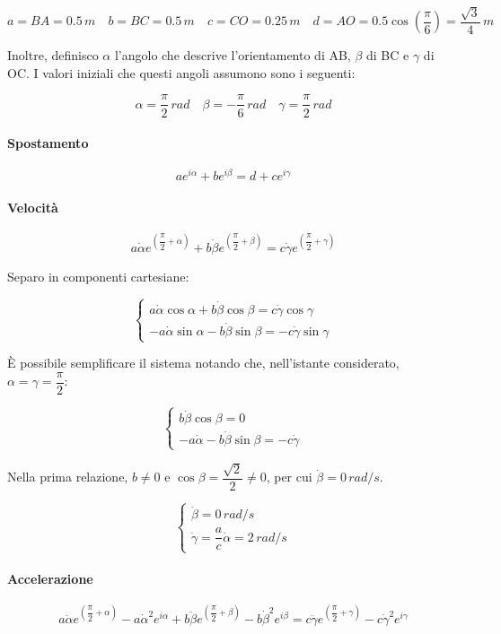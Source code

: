 \documentclass[main.tex]{subfiles}
\begin{document}
\[
	a = BA = 0.5\,m\quad
	b = BC = 0.5\,m\quad
	c = CO = 0.25\,m\quad
	d = AO = 0.5\cos\left( \dfrac{\pi}{6} \right ) = \dfrac{\sqrt{3}}{4}\,m
\]

Inoltre, definisco $\alpha$ l'angolo che descrive l'orientamento di AB, $\beta$ di BC e $\gamma$ di OC. I valori iniziali che questi angoli assumono sono i seguenti:

\[
	\alpha = \dfrac{\pi}{2}\,rad\quad
	\beta = -\dfrac{\pi}{6}\,rad\quad
	\gamma = \dfrac{\pi}{2}\,rad
\]

\paragraph{Spostamento}
\[
	ae^{i\alpha} + be^{i\beta} = d + ce^{i\gamma}
\]

\paragraph{Velocità}
\[
	a\dot{\alpha}e^{\left( \dfrac{\pi}{2} + \alpha \right )} + b\dot{\beta}e^{\left( \dfrac{\pi}{2} + \beta \right )} =  c\dot{\gamma}e^{\left( \dfrac{\pi}{2} + \gamma \right )}
\]

Separo in componenti cartesiane:

\[
\begin{cases}
	a\dot{\alpha}\cos\alpha + b\dot{\beta}\cos\beta = c\dot{\gamma}\cos\gamma\\
	-a\dot{\alpha}\sin\alpha - b\dot{\beta}\sin\beta = -c\dot{\gamma}\sin\gamma
\end{cases}
\]

È possibile semplificare il sistema notando che, nell'istante considerato, $\alpha = \gamma = \dfrac{\pi}{2}$:

\[
\begin{cases}
	b\dot{\beta}\cos\beta = 0\\
	-a\dot{\alpha} - b\dot{\beta}\sin\beta = -c\dot{\gamma}
\end{cases}
\]

Nella prima relazione, $b\neq0$ e $\cos\beta = \dfrac{\sqrt{2}}{2} \neq 0$, per cui $\dot{\beta} = 0\,rad/s$.

\[
\begin{cases}
	\dot{\beta} = 0\,rad/s\\
	\dot{\gamma} = \dfrac{a}{c}\dot{\alpha} = 2\,rad/s
\end{cases}
\]

\paragraph{Accelerazione}
\[
a\ddot{\alpha}e^{\left( \dfrac{\pi}{2} + \alpha \right )} - a\dot{\alpha}^2e^{i\alpha} + b\ddot{\beta}e^{\left( \dfrac{\pi}{2} + \beta \right )} - b\dot{\beta}^2e^{i\beta}=  c\ddot{\gamma}e^{\left( \dfrac{\pi}{2} + \gamma \right )}  - c\dot{\gamma}^2e^{i\gamma}
\]
\end{document}
